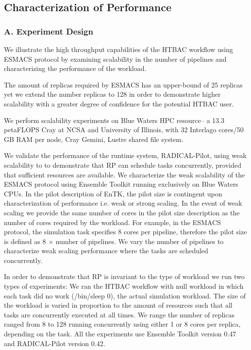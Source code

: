 \subsection{Characterization of Performance}

\subsubsection{A. Experiment Design}

We illustrate the high throughput capabilities of the HTBAC workflow using ESMACS protocol by examining scalability in the number of pipelines and characterizing the performance of the workload. 

The amount of replicas required by ESMACS has an upper-bound of 25 replicas yet we extend the number replicas to 128 in order to demonstrate higher scalability with a greater degree of confidence for the potential HTBAC user.   

We perform scalability experiments on Blue Waters HPC resource-- a 13.3 petaFLOPS Cray at NCSA and University of Illinois, with 32 Interlago cores/50 GB RAM per node, Cray Gemini, Lustre shared file system. 

We validate the performance of the runtime system, RADICAL-Pilot, using weak scalability to to demonstrate that RP can schedule tasks concurrently, provided that sufficient resources are available. We characterize the weak scalability of the ESMACS protocol using Ensemble Toolkit running exclusively on Blue Waters CPUs. In the pilot description of EnTK, the pilot size is contingent upon characterization of performance i.e. weak or strong scaling. In the event of weak scaling we provide the same number of cores in the pilot size description as the number of cores required by the workload. For example, in the ESMACS protocol, the simulation task specifies 8 cores per pipeline, therefore the pilot size is defined as 8 $\times$ number of pipelines. We vary the number of pipelines to characterize weak scaling performance where the tasks are scheduled concurrently.

In order to demonstrate that RP is invariant to the type of workload we run two types of experiments: We ran the HTBAC workflow with null workload in which each task did no work (/bin/sleep 0), the actual simulation workload. The size of the workload is varied in proportion to the amount of resources such that all tasks are concurrently executed at all times. We range the number of replicas ranged from 8 to 128 running concurrently using either 1 or 8 cores per replica, depending on the task. All the experiments use Ensemble Toolkit version 0.47 and RADICAL-Pilot version 0.42.

